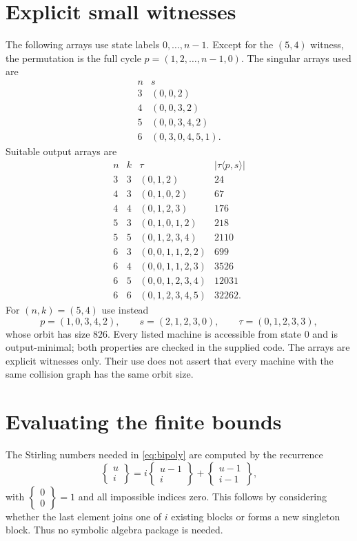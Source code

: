 \documentclass[11pt,a4paper]{article}
\numberwithin{equation}{section}
\theoremstyle{definition}
\theoremstyle{remark}
\newcommand{\stirling}[2]{\left\{\!\begin{matrix}#1\\#2\end{matrix}\!\right\}}
\begin{document}
\appendix
\section{Explicit small witnesses}\label{app:witnesses}

The following arrays use state labels $0,\ldots,n-1$. Except for the
$(5,4)$ witness, the permutation is the full cycle
$p=(1,2,\ldots,n-1,0)$. The singular arrays used are
\[
\begin{array}{c|l}
 n&s\\\hline
3&(0,0,2)\\
4&(0,0,3,2)\\
5&(0,0,3,4,2)\\
6&(0,3,0,4,5,1).
\end{array}
\]
Suitable output arrays are
\[
\begin{array}{cc|l|r}
n&k&\tau&|\tau\langle p,s\rangle|\\\hline
3&3&(0,1,2)&24\\
4&3&(0,1,0,2)&67\\
4&4&(0,1,2,3)&176\\
5&3&(0,1,0,1,2)&218\\
5&5&(0,1,2,3,4)&2110\\
6&3&(0,0,1,1,2,2)&699\\
6&4&(0,0,1,1,2,3)&3526\\
6&5&(0,0,1,2,3,4)&12031\\
6&6&(0,1,2,3,4,5)&32262.
\end{array}
\]
For $(n,k)=(5,4)$ use instead
\[
 p=(1,0,3,4,2),\qquad s=(2,1,2,3,0),\qquad
 \tau=(0,1,2,3,3),
\]
whose orbit has size $826$. Every listed machine is accessible from state
$0$ and is output-minimal; both properties are checked in the supplied code.
The arrays are explicit witnesses only. Their use does not assert that every
machine with the same collision graph has the same orbit size.

\section{Evaluating the finite bounds}\label{app:bounds}

The Stirling numbers needed in \eqref{eq:bipoly} are computed by the recurrence
\[
 \stirling{u}{i}=i\stirling{u-1}{i}+\stirling{u-1}{i-1},
\]
with $\stirling{0}{0}=1$ and all impossible indices zero. This follows by
considering whether the last element joins one of $i$ existing blocks or
forms a new singleton block. Thus no symbolic algebra package is needed.
\end{document}
